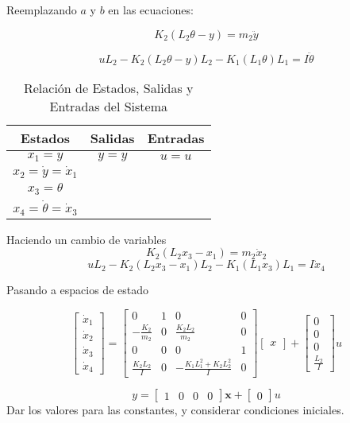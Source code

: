\documentclass{report}
\begin{document}
Reemplazando \(a\) y \(b\) en las ecuaciones:

\[
K_2(L_2\theta - y) = m_2\ddot{y}
\]

\[
uL_2 - K_2(L_2\theta - y)L_2 - K_1(L_1\theta)L_1 = I\ddot{\theta}
\]

\begin{table}[H]
    \centering
    \begin{tabular}{|c|c|c|}
        \hline
        \textbf{Estados} & \textbf{Salidas} & \textbf{Entradas} \\
        \hline
        \(x_1 = y\) & \(y = y\) & \(u = u\) \\
        \(x_2 = \dot{y} = \dot{x}_1\) & & \\
        \(x_3 = \theta\) & & \\
        \(x_4 = \dot{\theta} = \dot{x}_3\) & & \\
        \hline
    \end{tabular}
    \caption{Relación de Estados, Salidas y Entradas del Sistema}
    \label{tabla:estados_salidas_entradas}
\end{table}

Haciendo un cambio de variables
\[
K_2 (L_2 x_3 - x_1) = m_2 \dot{x}_2
\]
\[
u L_2 - K_2 (L_2 x_3 - x_1) L_2 - K_1 (L_1 x_3) L_1 = I \dot{x}_4
\]

Pasando a espacios de estado

\[
\begin{bmatrix}
\dot{x}_1 \\
\dot{x}_2 \\
\dot{x}_3 \\
\dot{x}_4
\end{bmatrix}
=
\begin{bmatrix}
0 & 1 & 0 & 0 \\
-\frac{K_2}{m_2} & 0 & \frac{K_2 L_2}{m_2} & 0 \\
0 & 0 & 0 & 1 \\
\frac{K_2 L_2}{I} & 0 & -\frac{K_1 L_1^2 + K_2 L_2^2}{I} & 0
\end{bmatrix}
\begin{bmatrix}
x
\end{bmatrix}
+
\begin{bmatrix}
0 \\
0 \\
0 \\
\frac{L_2}{I}
\end{bmatrix} u
\]

\[
y = \begin{bmatrix}
1 & 0 & 0 & 0
\end{bmatrix} \mathbf{x} + \begin{bmatrix}
0
\end{bmatrix} u
\]
Dar los valores para las constantes, y considerar condiciones iniciales.
\end{document}
